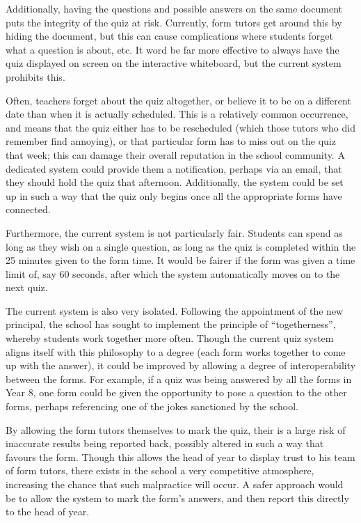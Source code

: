Additionally, having the questions and possible answers on the same document puts the integrity of the quiz at risk. Currently, form tutors get around this by hiding the document, but this can cause complications where students forget what a question is about, etc. It word be far more effective to always have the quiz displayed on screen on the interactive whiteboard, but the current system prohibits this.

Often, teachers forget about the quiz altogether, or believe it to be on a different date than when it is actually scheduled. This is a relatively common occurrence, and means that the quiz either has to be rescheduled (which those tutors who did remember find annoying), or that particular form has to miss out on the quiz that week; this can damage their overall reputation in the school community. A dedicated system could provide them a notification, perhaps via an email, that they should hold the quiz that afternoon. Additionally, the system could be set up in such a way that the quiz only begins once all the appropriate forms have connected.

Furthermore, the current system is not particularly fair. Students can spend as long as they wish on a single question, as long as the quiz is completed within the 25 minutes given to the form time. It would be fairer if the form was given a time limit of, say 60 seconds, after which the system automatically moves on to the next quiz.

The current system is also very isolated. Following the appointment of the new principal, the school has sought to implement the principle of ``togetherness'', whereby students work together more often. Though the current quiz system aligns itself with this philosophy to a degree (each form works together to come up with the answer), it could be improved by allowing a degree of interoperability between the forms. For example, if a quiz was being answered by all the forms in Year 8, one form could be given the opportunity to pose a question to the other forms, perhaps referencing one of the jokes sanctioned by the school.

By allowing the form tutors themselves to mark the quiz, their is a large risk of
inaccurate results being reported back, possibly altered in such a way that favours the form. Though this allows the head of year to display trust to his team of form tutors, there exists in the school a very competitive atmosphere, increasing the chance that such malpractice will occur. A safer approach would be to allow the system to mark the form's answers, and then report this directly to the head of year.

